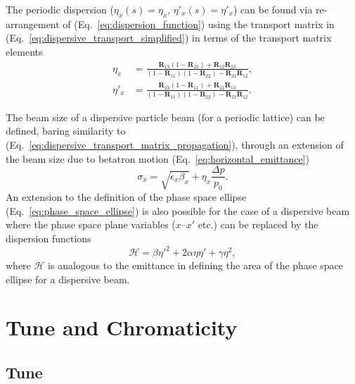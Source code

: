 \documentclass[../main.tex]{subfiles}
\begin{document}
The periodic dispersion ($\eta_{x}\left(s\right)=\eta_{x}$, $\eta'_{x}\left(s\right)=\eta'_{x}$) can be found via re-arrangement of (Eq.~\ref{eq:dispersion_function}) using the transport matrix in (Eq.~\ref{eq:dispersive_transport_simplified}) in terms of the transport matrix elements
\begin{align}
\eta_{x} &= \frac{\boldsymbol{R}_{13}\left(1-\boldsymbol{R}_{22}\right)+\boldsymbol{R}_{12}\boldsymbol{R}_{23}}{\left(1-\boldsymbol{R}_{11}\right)\left(1-\boldsymbol{R}_{22}\right)-\boldsymbol{R}_{21}\boldsymbol{R}_{12}},
\label{eq:periodic_dispersion} \\
\eta'_{x} &= \frac{\boldsymbol{R}_{23}\left(1-\boldsymbol{R}_{11}\right)+\boldsymbol{R}_{21}\boldsymbol{R}_{13}}{\left(1-\boldsymbol{R}_{11}\right)\left(1-\boldsymbol{R}_{22}\right)-\boldsymbol{R}_{21}\boldsymbol{R}_{12}}.
\label{eq:periodic_dispersion_prime}
\end{align}

The beam size of a dispersive particle beam (for a periodic lattice) can be defined, baring similarity to (Eq.~\ref{eq:dispersive_transport_matrix_propagation}), through an extension of the beam size due to betatron motion (Eq.~\ref{eq:horizontal_emittance})
\begin{equation}
\sigma_{x} = \sqrt{\epsilon_{x}\beta_{x}} + \eta_{x}\frac{\Delta p}{p_{0}}.
\label{eq:dispersive_beam_size}    
\end{equation}
An extension to the definition of the phase space ellipse (Eq.~\ref{eq:phase_space_ellipse}) is also possible for the case of a dispersive beam where the phase space plane variables ($x$--$x'$ etc.) can be replaced by the dispersion functions
\begin{equation}
\mathcal{H} = \beta\eta'^{2}+2\alpha\eta\eta'+\gamma\eta^{2},
\label{eq:dispersive_phase_space_ellipse}    
\end{equation}
where $\mathcal{H}$ is analogous to the emittance in defining the area of the phase space ellipse for a dispersive beam.

\section{Tune and Chromaticity}

\subsection{Tune}
\end{document}

